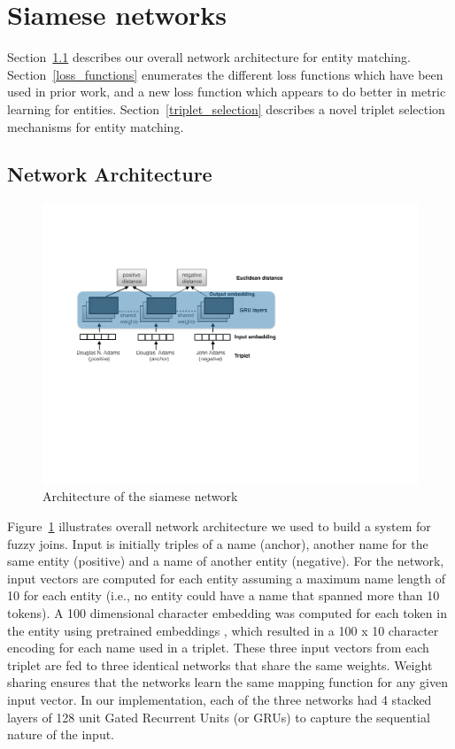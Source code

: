 \section{Siamese networks}
\label{siamese networks}

Section~\ref{architecture} describes our overall network architecture for entity matching.  Section~\ref{loss_functions} enumerates the different loss functions which have been used in prior work, and a new loss function which appears to do better in metric learning for entities.  Section~\ref{triplet_selection} describes a novel triplet selection mechanisms for entity matching.

\subsection{Network Architecture}
\label{architecture}
\begin{figure}
\includegraphics[width=1.0\linewidth]{triplet_siamese_network}
\caption{Architecture of the siamese network}
\label{siamese_nets}
\end{figure}

Figure~\ref{siamese_nets} illustrates overall network architecture we used to build a system for fuzzy joins.  Input is initially triples of a name (anchor), another name for the same entity (positive) and a name of another entity (negative).  For the network, input vectors are computed for each entity assuming a maximum name length of 10 for each entity (i.e., no entity could have a name that spanned more than 10 tokens).  A 100 dimensional character embedding was computed for each token in the entity using pretrained embeddings \cite{hashimoto-jmt:2017:EMNLP2017}, which resulted in a 100 x 10 character encoding for each name used in a triplet.  These three input vectors from each triplet are fed to three identical networks that share the same weights.  Weight sharing ensures that the networks learn the same mapping function for any given input vector.  In our implementation, each of the three networks had 4 stacked layers of 128 unit Gated Recurrent Units (or GRUs) to capture the sequential nature of the input.  

